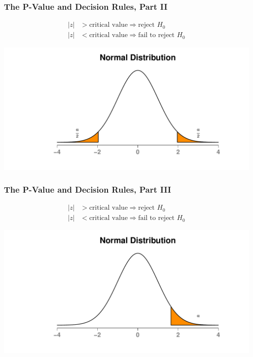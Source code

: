 \documentclass[12pt, block=fill]{beamer}
\begin{document}
\begin{frame}
  \frametitle{The P-Value and Decision Rules, Part II}
  \begin{align*}
    |z| & > \text{critical value} \Rightarrow \text{reject } H_{0} \\
    |z| & < \text{critical value} \Rightarrow \text{fail to reject } H_{0}
  \end{align*}

  \begin{center}
    \includegraphics[width=\textwidth]{figures/normal_with_two_tails}
  \end{center}
\end{frame}

\begin{frame}
  \frametitle{The P-Value and Decision Rules, Part III}
  \begin{align*}
    |z| & > \text{critical value} \Rightarrow \text{reject } H_{0} \\
    |z| & < \text{critical value} \Rightarrow \text{fail to reject } H_{0}
  \end{align*}

  \begin{center}
    \includegraphics[width=\textwidth]{figures/normal_with_one_tail}
  \end{center}
\end{frame}
\end{document}
